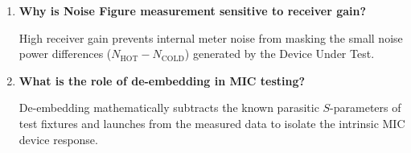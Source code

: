 \documentclass[10pt,a4paper]{article}
\newcommand{\Q}[1]{\textbf{#1}\par\vspace{2pt}}
\begin{document}
\begin{tcolorbox}[exambox, title={\textbf{Frequently Asked / Viva Questions}}]
\begin{enumerate}[topsep=0pt, label=\textbf{Q\arabic*.}, itemsep=5pt]
    \item \Q{Why is Noise Figure measurement sensitive to receiver gain?}
    High receiver gain prevents internal meter noise from masking the small noise power differences ($N_{\text{HOT}} - N_{\text{COLD}}$) generated by the Device Under Test.

    \item \Q{What is the role of de-embedding in MIC testing?}
    De-embedding mathematically subtracts the known parasitic $S$-parameters of test fixtures and launches from the measured data to isolate the intrinsic MIC device response.
  \end{enumerate}
\end{tcolorbox}
\end{document}
